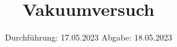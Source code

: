 

\subject{v70}
\title{Vakuumversuch}
\date{%
  Durchführung: 17.05.2023
  \hspace{3em}
  Abgabe: 18.05.2023
}



\maketitle
\thispagestyle{empty}
\tableofcontents
\newpage






\printbibliography{}


